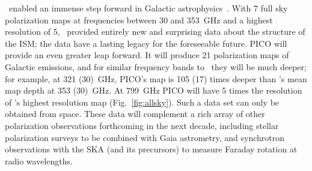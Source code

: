 \documentclass[PICOReport.tex]{subfiles}
\begin{document}
\planck\ enabled an immense step forward in Galactic astrophysics~\citep{Planck2018:XII}. With 7 full sky polarization maps at frequencies between 30 and 353~GHz and a highest resolution of 5\arcmin, \planck\ provided entirely new and surprising data about the structure of the \ac{ISM}; the data have a lasting legacy for the foreseeable future. PICO will provide an even greater leap forward. It will produce 21 polarization maps of Galactic emissions, and for similar frequency bands to \planck\ they will be much deeper; for example, at 321 (30)~GHz, PICO's map is 105 (17) times deeper than \planck's mean map depth at 353 (30)~GHz.  At 799~GHz PICO will have 5 times the resolution of \planck 's highest resolution map (Fig.~\ref{fig:allsky}). Such a data set can only be obtained from space. These data will complement a rich array of other polarization observations forthcoming in the next decade, including stellar polarization surveys to be combined with Gaia astrometry, and synchrotron observations with the SKA (and its precursors) to measure Faraday rotation at radio wavelengths.
\end{document}
